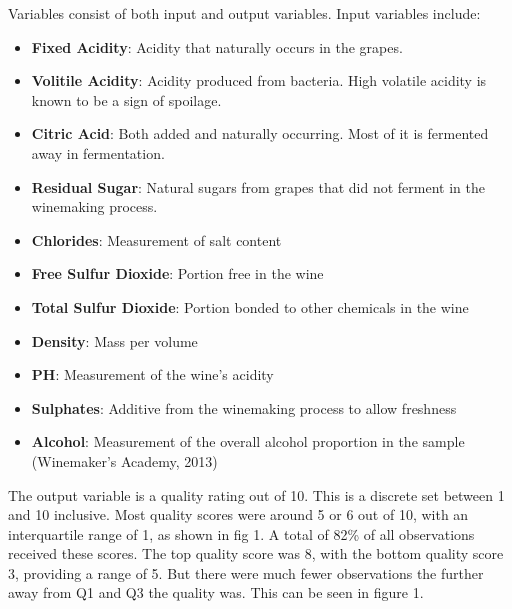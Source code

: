 \documentclass[a4paper,9pt,twocolumn,twoside,]{pinp}
\providecommand{\tightlist}{%
  \setlength{\itemsep}{0pt}\setlength{\parskip}{0pt}}
\begin{document}
Variables consist of both input and output variables. Input variables
include:

\begin{itemize}
\tightlist
\item
  \textbf{Fixed Acidity}: Acidity that naturally occurs in the grapes.
\item
  \textbf{Volitile Acidity}: Acidity produced from bacteria. High
  volatile acidity is known to be a sign of spoilage.
\item
  \textbf{Citric Acid}: Both added and naturally occurring. Most of it
  is fermented away in fermentation.
\item
  \textbf{Residual Sugar}: Natural sugars from grapes that did not
  ferment in the winemaking process.
\item
  \textbf{Chlorides}: Measurement of salt content
\item
  \textbf{Free Sulfur Dioxide}: Portion free in the wine
\item
  \textbf{Total Sulfur Dioxide}: Portion bonded to other chemicals in
  the wine
\item
  \textbf{Density}: Mass per volume
\item
  \textbf{PH}: Measurement of the wine's acidity
\item
  \textbf{Sulphates}: Additive from the winemaking process to allow
  freshness
\item
  \textbf{Alcohol}: Measurement of the overall alcohol proportion in the
  sample \newline(Winemaker's Academy, 2013)
\end{itemize}

The output variable is a quality rating out of 10. This is a discrete
set between 1 and 10 inclusive. Most quality scores were around 5 or 6
out of 10, with an interquartile range of 1, as shown in fig 1. A total
of 82\% of all observations received these scores. The top quality score
was 8, with the bottom quality score 3, providing a range of 5. But
there were much fewer observations the further away from Q1 and Q3 the
quality was. This can be seen in figure 1.
\end{document}
